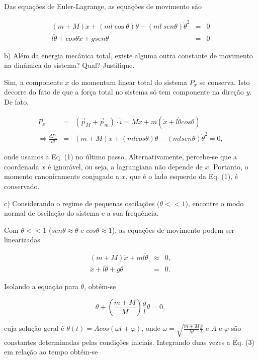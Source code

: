 \begin{enumerate}[start=1,label={\bfseries Q\arabic*.}]
Das equações de Euler-Lagrange, as equações de movimento são

\begin{eqnarray}
(m + M) \ddot{x} + (ml \cos \theta) \ddot{\theta} - (ml \ sen \theta) \dot{\theta}^{2} &=& 0 \\
l \ddot{\theta} + cos \theta \ddot{x} + g sen \theta &=& 0
\end{eqnarray}


b) Além da energia mecânica total, existe alguma outra constante de movimento na dinâmica do sistema?          Qual? Justifique.

\resposta

Sim, a componente $x$ do momentum linear total do sistema $P_{x}$ se conserva. Isto decorre do fato de que a força total no sistema só tem componente na direção $y$. De fato,

\begin{eqnarray*}
P_{x} &=& (\vec{p}_{M} + \vec{p}_{m})\cdot \hat{i} = M\dot{x} + m (\dot{x} + l \dot{\theta} cos \theta) \\
\Rightarrow \frac{dP_{x}}{dt} &=& (m+M)\ddot{x} + (mlcos\theta)\ddot{\theta} - (mlsen\theta)\dot{\theta}^{2} = 0,
\end{eqnarray*}

onde usamos a Eq. (1) no último passo. Alternativamente, percebe-se que a coordenada $x$ é ignorável, ou seja, a lagrangiana não depende de $x$. Portanto, o momento canonicamente conjugado a $x$, que é o lado esquerdo da Eq. (1), é conservado.


c) Considerando o regime de pequenas oscilações ($\theta << 1$), encontre o modo normal de oscilação do sistema e a sua frequência.

\resposta

Com $\theta << 1$ ($sen \theta \approx \theta$ e $cos \theta \approx 1$), as equações de movimento podem ser linearizadas

\begin{eqnarray}
(m+M)\ddot{x} + ml\ddot{\theta} &\approx & 0, \\
\ddot{x} + l\ddot{\theta} + g \theta &=& 0.
\end{eqnarray}

Isolando a equação para $\theta$, obtém-se

$$
\ddot{\theta} + \left( \frac{m+M}{M}  \right) \frac{g}{l} \theta = 0,
$$


cuja solução geral é $\theta (t) = A cos (\omega t + \varphi)$, onde $\omega = \sqrt{\frac{m+M}{M} \frac{g}{l}}$ e $A$ e $\varphi$ são constantes determinadas pelas condições iniciais. Integrando duas vezes a Eq. (3) em relação ao tempo obtém-se


\end{enumerate}
